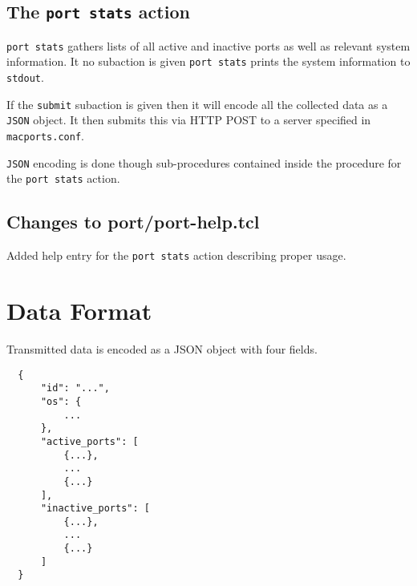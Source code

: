 \documentclass[10pt]{article}
\begin{document}
\subsection{The \texttt{port stats} action}
\texttt{port stats} gathers lists of all active and inactive ports as well as relevant system information. It no subaction is given \texttt{port stats} prints the system information to \texttt{stdout}.

If the \texttt{submit} subaction is given then it will encode all the collected data as a \texttt{JSON} object. It then submits this via HTTP POST to a server specified in \texttt{macports.conf}.

\texttt{JSON} encoding is done though sub-procedures contained inside the procedure for the \texttt{port stats} action.

\subsection{Changes to port/port-help.tcl}

Added help entry for the \texttt{port stats} action describing proper usage.

\section{Data Format}

Transmitted data is encoded as a JSON object with four fields.

\begin{verbatim}
  {
      "id": "...",
      "os": {
          ...
      },
      "active_ports": [
          {...}, 
          ...
          {...}
      ],
      "inactive_ports": [
          {...}, 
          ...
          {...}
      ]
  }
\end{verbatim}
\end{document}
